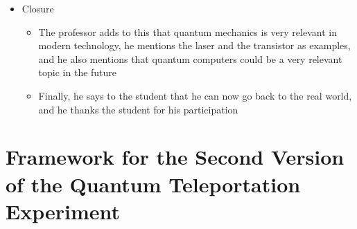 \documentclass[11pt,twoside]{report} %
\begin{document}
\begin{itemize}
\begin{itemize}
	\end{itemize}
	\item Closure
	\begin{itemize}
		\item The professor adds to this that quantum mechanics is very relevant in modern technology, he mentions the laser and the transistor as examples, and he also mentions that quantum computers could be a very relevant topic in the future
		\item Finally, he says to the student that he can now go back to the real world, and he thanks the student for his participation
	\end{itemize}
\end{itemize}

\newpage

\section{Framework for the Second Version of the Quantum Teleportation Experiment}
\label{app:teleportation2}
\end{document}
